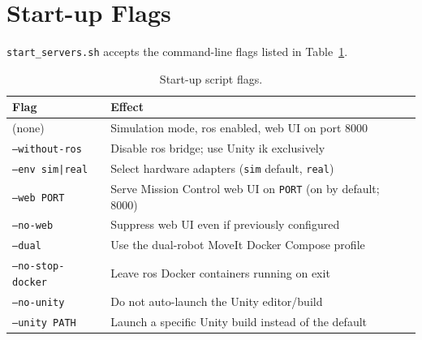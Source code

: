 \section{Start-up Flags}\label{sec:startup_flags}
\texttt{start\_servers.sh} accepts the command-line flags listed in Table~\ref{tab:config_startup}.

\begin{table}[t]
	\centering
	\begin{tabular}{ll}
		\toprule
		\textbf{Flag}             & \textbf{Effect}                                                     \\
		\midrule
		(none)                    & Simulation mode, \gls{ros} enabled, web UI on port 8000             \\
		\texttt{--without-ros}    & Disable \gls{ros} bridge; use Unity \gls{ik} exclusively            \\
		\texttt{--env sim|real}   & Select hardware adapters (\texttt{sim} default, \texttt{real})      \\
		\texttt{--web PORT}       & Serve Mission Control web UI on \texttt{PORT} (on by default; 8000) \\
		\texttt{--no-web}         & Suppress web UI even if previously configured                       \\
		\texttt{--dual}           & Use the dual-robot MoveIt Docker Compose profile                    \\
		\texttt{--no-stop-docker} & Leave \gls{ros} Docker containers running on exit                   \\
		\texttt{--no-unity}       & Do not auto-launch the Unity editor/build                           \\
		\texttt{--unity PATH}     & Launch a specific Unity build instead of the default                \\
		\bottomrule
	\end{tabular}
	\caption{Start-up script flags.}
	\label{tab:config_startup}
\end{table}

